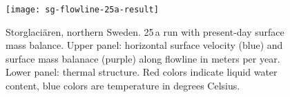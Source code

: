 \begin{figure}[ht]
  \centering
  \texttt{[image: sg-flowline-25a-result]}
  \caption{Storglaci{\"a}ren, northern Sweden. 25\,a run with present-day surface mass balance. Upper panel: horizontal surface velocity (blue) and surface mass balanace (purple) along flowline in meters per year. Lower panel: thermal structure. Red colors indicate liquid water content, blue colors are temperature in degrees Celsius.}
  \label{fig:storglaciaren-25a-result}
\end{figure}

